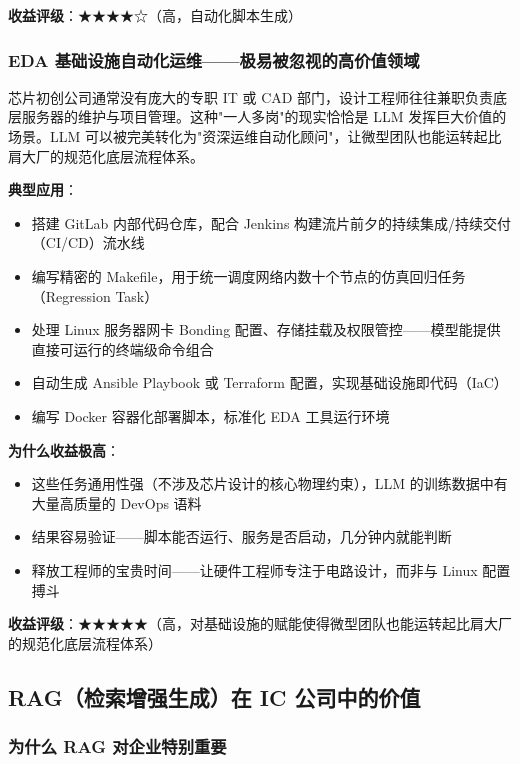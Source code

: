 \documentclass[UTF8,a4paper,10pt,oneside]{ctexart}
\begin{document}
\textbf{收益评级}：★★★★☆（高，自动化脚本生成）

\subsubsection{EDA 基础设施自动化运维——极易被忽视的高价值领域}

芯片初创公司通常没有庞大的专职 IT 或 CAD 部门，设计工程师往往兼职负责底层服务器的维护与项目管理。这种"一人多岗"的现实恰恰是 LLM 发挥巨大价值的场景。LLM 可以被完美转化为"资深运维自动化顾问"，让微型团队也能运转起比肩大厂的规范化底层流程体系。

\textbf{典型应用}：
\begin{itemize}
    \item 搭建 GitLab 内部代码仓库，配合 Jenkins 构建流片前夕的持续集成/持续交付（CI/CD）流水线
    \item 编写精密的 Makefile，用于统一调度网络内数十个节点的仿真回归任务（Regression Task）
    \item 处理 Linux 服务器网卡 Bonding 配置、存储挂载及权限管控——模型能提供直接可运行的终端级命令组合
    \item 自动生成 Ansible Playbook 或 Terraform 配置，实现基础设施即代码（IaC）
    \item 编写 Docker 容器化部署脚本，标准化 EDA 工具运行环境
\end{itemize}

\textbf{为什么收益极高}：
\begin{itemize}
    \item 这些任务通用性强（不涉及芯片设计的核心物理约束），LLM 的训练数据中有大量高质量的 DevOps 语料
    \item 结果容易验证——脚本能否运行、服务是否启动，几分钟内就能判断
    \item 释放工程师的宝贵时间——让硬件工程师专注于电路设计，而非与 Linux 配置搏斗
\end{itemize}

\textbf{收益评级}：★★★★★（高，对基础设施的赋能使得微型团队也能运转起比肩大厂的规范化底层流程体系）

\subsection{RAG（检索增强生成）在 IC 公司中的价值}

\subsubsection{为什么 RAG 对企业特别重要}
\end{document}
